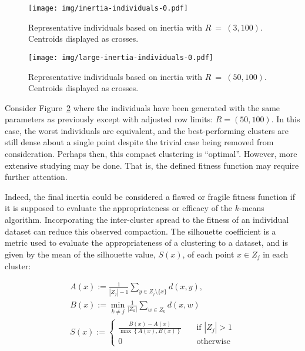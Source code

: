 \begin{figure}[htbp]
    \ContinuedFloat*
    \centering
    \texttt{[image: img/inertia-individuals-0.pdf]}
    \caption{%
        \label{figure:inertia-individuals}
        Representative individuals based on inertia with \(R~=~(3,100)\).
        Centroids displayed as crosses.
    }
\end{figure}

\begin{figure}[htbp]
    \ContinuedFloat%
    \centering
    \texttt{[image: img/large-inertia-individuals-0.pdf]}
    \caption{%
        \label{figure:large-inertia-individuals}
        Representative individuals based on inertia with \(R~=~(50,100)\).
        Centroids displayed as crosses.
    }
\end{figure}

Consider Figure~\ref{figure:large-inertia-individuals} where the individuals
have been generated with the same parameters as previously except with adjusted
row limits: \(R = (50, 100)\). In this case, the worst individuals are
equivalent, and the best-performing clusters are still dense about a single
point despite the trivial case being removed from consideration. Perhaps then,
this compact clustering is ``optimal''. However, more extensive studying may be
done. That is, the defined fitness function may require further attention.

Indeed, the final inertia could be considered a flawed or fragile fitness
function if it is supposed to evaluate the appropriateness or efficacy of the
\(k\)-means algorithm. Incorporating the inter-cluster spread to the fitness of
an individual dataset can reduce this observed compaction. The silhouette
coefficient is a metric used to evaluate the appropriateness of a clustering to
a dataset, and is given by the mean of the silhouette value, \(S(x)\), of each
point \(x \in Z_j\) in each cluster:

\begin{equation}
    \begin{gathered}
        A(x) := \frac{1}{|Z_j| - 1} \sum_{y \in Z_j \setminus \{x\}} d(x, y),
        \\
        B(x) := \min_{k \neq j} \frac{1}{|Z_k|} \sum_{w \in Z_k} d(x, w)
        \\
        \label{eq:silhouette}S(x) := 
            \begin{cases}
                \frac{B(x) - A(x)}{\max\left\{A(x), B(x)\right\}}
                &\quad \text{if } |Z_j| > 1\\
                0 &\quad \text{otherwise}
            \end{cases}
    \end{gathered}
\end{equation}\\


